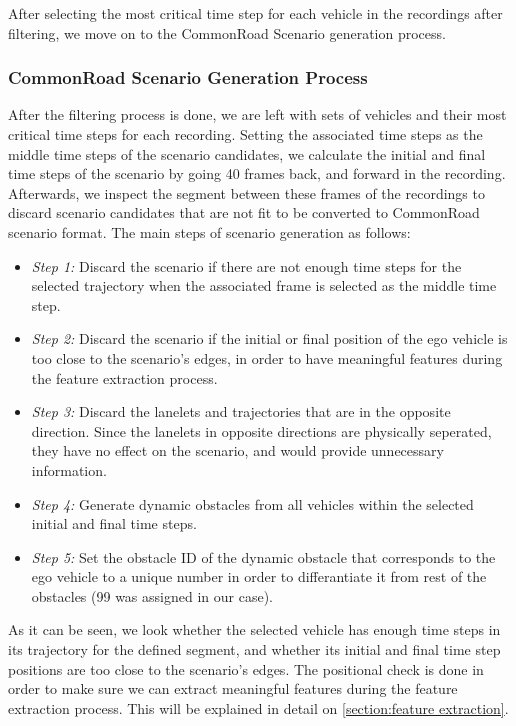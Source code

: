 \documentclass[conference]{IEEEtran}
\begin{document}
After selecting the most critical time step for each vehicle in the recordings after filtering, we move on to the CommonRoad Scenario generation process.
\\

\subsubsection{CommonRoad Scenario Generation Process}
\label{subsubsection:scenario generation process}
After the filtering process is done, we are left with sets of vehicles and their most critical time steps for each recording. Setting the associated time steps as the middle time steps of the scenario candidates, we calculate the initial and final time steps of the scenario by going 40 frames back, and forward in the recording. Afterwards, we inspect the segment between these frames of the recordings to discard scenario candidates that are not fit to be converted to CommonRoad scenario format. The main steps of scenario generation as follows:

\begin{itemize}
	\item \textit{Step 1:} Discard the scenario if there are not enough time steps for the selected trajectory when the associated frame is selected as the middle time step.
	\item \textit{Step 2:} Discard the scenario if the initial or final position of the ego vehicle is too close to the scenario's edges, in order to have meaningful features during the feature extraction process.
	\item \textit{Step 3:} Discard the lanelets and trajectories that are in the opposite direction. Since the lanelets in opposite directions are physically seperated, they have no effect on the scenario, and would provide unnecessary information.
	\item \textit{Step 4:} Generate dynamic obstacles from all vehicles within the
selected initial and final time steps.
	\item \textit{Step 5:} Set the obstacle ID of the dynamic obstacle that corresponds to the ego vehicle to a unique number in order to differantiate it from rest of the obstacles (99 was assigned in our case).
\end{itemize}

As it can be seen, we look whether the selected vehicle has enough time steps in its trajectory for the defined segment, and whether its initial and final time step positions are too close to the scenario's edges. The positional check is done in order to make sure we can extract meaningful features during the feature extraction process. This will be explained in detail on \autoref{section:feature extraction}.
\end{document}
